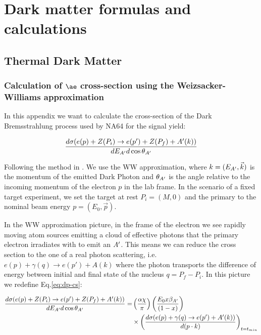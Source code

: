 
\chapter{Dark matter formulas and calculations} %

\label{AppendixA} %

\section{Thermal Dark Matter}
\label{appA:sec:thermal-dark-matter}

\subsection{Calculation of $\ae$ cross-section using the Weizsacker-Williams approximation}
\label{appA:sec:cross-section-wz}

In this appendix we want to calculate the cross-section of the Dark Bremsstrahlung process used by NA64 for the signal yield:

\begin{equation}
  \label{eq:dp-cs}
  \frac{d\sigma(e(p) + Z(P_i) \to e(p') + Z(P_f) + A'(k))}{dE_{A'}d\cos{\theta_{A'}}}
\end{equation}

Following the method in \cite{jdb}. We use the WW approximation, where $k=(E_{A'},\vec{k})$ is the momentum of the emitted Dark Photon and $\theta_{A'}$ is the angle relative to the incoming momentum of the electron $p$ in the lab frame. In the scenario of a fixed target experiment, we set the target at rest $P_i = (M,0)$ and the primary to the nominal beam energy $p = (E_0, \vec{p})$.

In the WW approximation picture, in the frame of the electron we see rapidly moving atom sources emitting a cloud of effective photons that the primary electron irradiates with to emit an $A'$. This means we can reduce the cross section to the one of a real photon scattering, i.e. $e(p) + \gamma(q) \to e(p') + A(k)$ where the photon transports the difference of energy between initial and final state of the nucleus $q = P_f - P_i$. In this picture we redefine Eq.\ref{eq:dp-cs}:

\begin{equation}
  \label{eq:dp-cs-ww}
  \begin{aligned}
    \frac{d\sigma(e(p) + Z(P_i) \to e(p') + Z(P_f) + A'(k))}{dE_{A'}d\cos{\theta_{A'}}} = &\left(\frac{\alpha \chi}{\pi} \right) \left(\frac{E_0 x \beta_{A'}}{(1 - x)} \right) \\
    &\times \left( \frac{d\sigma(e(p) + \gamma(q) \to e(p') + A'(k))}{d(p \cdot k)} \right)_{t = t_{min}}
   \end{aligned}
 \end{equation}

